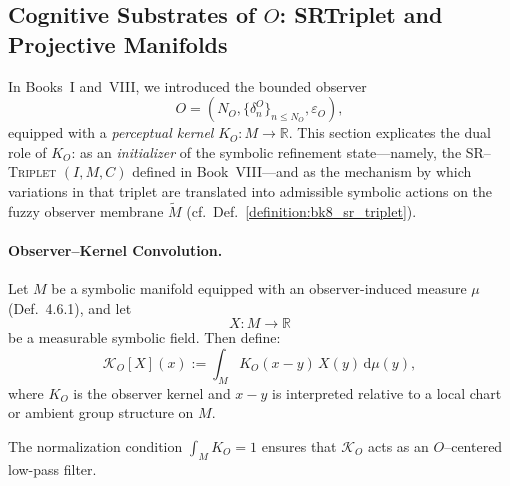 \subsection{\texorpdfstring{Cognitive Substrates of $O$}{Cognitive Substrates of O}: SR\textendash{}Triplet and Projective Manifolds}
\label{subsec:bk4_cognitive_substrates_of_o}

In Books~I and~VIII, we introduced the bounded observer
\[
O = (N_O, \{\delta_n^O\}_{n \leq N_O}, \varepsilon_O),
\]
equipped with a \emph{perceptual kernel} $K_O \colon M \to \mathbb{R}$.
This section explicates the dual role of $K_O$: as an \emph{initializer}
of the symbolic refinement state—namely, the \textsc{SR--Triplet}
$(I, M, C)$ defined in Book~VIII—and as the mechanism by which variations in that triplet are translated into admissible symbolic actions on the fuzzy observer membrane $\widetilde{M}$ (cf.~Def.~\ref{definition:bk8_sr_triplet}).

\paragraph{Observer–Kernel Convolution.}
\begin{definition}
\label{definition:bk4_observer_kernel_convolution_map}
Let $M$ be a symbolic manifold equipped with an observer-induced measure $\mu$ (Def.~4.6.1), and let
\[
X \colon M \to \mathbb{R}
\]
be a measurable symbolic field. Then define:
\[
\mathcal{K}_O[X](x) := \int_M K_O(x - y)\, X(y)\, \mathrm{d}\mu(y),
\]
where $K_O$ is the observer kernel and $x - y$ is interpreted relative to a local chart or ambient group structure on $M$.

The normalization condition $\int_M K_O = 1$ ensures that $\mathcal{K}_O$
acts as an $O$--centered low-pass filter.
\end{definition}
